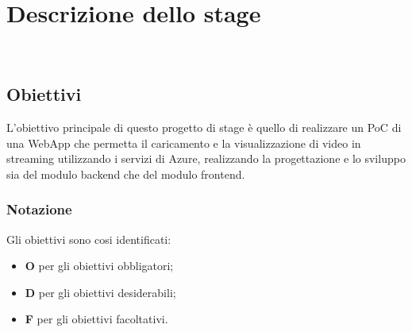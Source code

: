 \chapter{Descrizione dello stage}
\label{cap:analisi-requisiti}
\\
\label{cap:descrizione-stage}
\section{Obiettivi}
\label{sec:obiettivi}
L'obiettivo principale di questo progetto di stage è quello di realizzare un PoC di una WebApp che permetta il caricamento e la visualizzazione di video in streaming utilizzando i servizi di Azure, realizzando la progettazione e lo sviluppo sia del modulo backend che del modulo frontend.
\subsection{Notazione}
\label{subsec:notazione}
Gli obiettivi sono cosi identificati:
\begin{itemize}
    \item \textbf{O} per gli obiettivi obbligatori;
    \item \textbf{D} per gli obiettivi desiderabili;
    \item \textbf{F} per gli obiettivi facoltativi.
\end{itemize}
